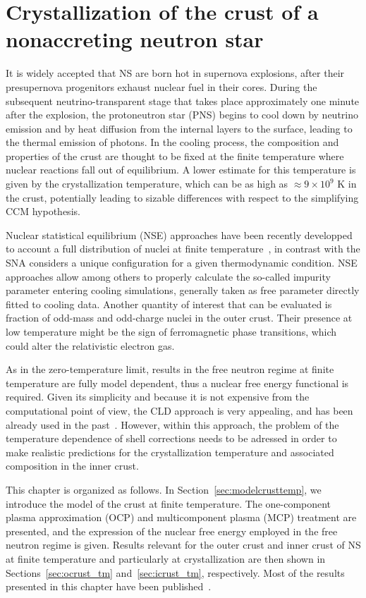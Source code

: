 \chapter{Crystallization of the crust of a nonaccreting neutron star}

It is widely accepted that NS are born hot in supernova 
explosions, after their presupernova progenitors exhaust nuclear fuel in their
cores. During the subsequent neutrino-transparent stage that takes place 
approximately one minute after the explosion, the protoneutron star (PNS) 
begins to cool down by neutrino emission and by heat diffusion from the 
internal layers to the surface, leading to the thermal emission of photons.
In the cooling process, the composition and properties of the crust are thought 
to be fixed at the finite temperature where nuclear reactions fall out of 
equilibrium. A lower estimate for this temperature is given by the 
crystallization temperature, which can be as high as $\approx 9\times 10^9$ K
in the crust, potentially leading to sizable differences with respect to
the simplifying CCM hypothesis.

Nuclear statistical equilibrium (NSE) approaches have been recently developped 
to account a full distribution of nuclei at finite 
temperature~\cite{Gulminelli2015}, in contrast with the SNA considers a unique
configuration for a given thermodynamic condition. NSE approaches allow among
others to properly calculate the so-called impurity parameter entering cooling
simulations, generally taken as free parameter directly fitted to cooling
data. Another quantity of interest that can be evaluated is fraction of 
odd-mass and odd-charge nuclei in the outer crust. Their presence at low
temperature might be the sign of ferromagnetic phase transitions, which could 
alter the relativistic electron gas.

As in the zero-temperature limit, results in the free neutron regime at
finite temperature are fully model dependent, thus a nuclear free energy
functional is required. Given its simplicity and because it is not expensive
from the computational point of view, the CLD approach is very appealing, and 
has been already used in the past~\cite{Gulminelli2015,Grams2018}. However,
within this approach, the problem of the temperature dependence of shell 
corrections needs to be adressed in order to make realistic predictions for the 
crystallization temperature and associated composition in the inner crust.

This chapter is organized as follows. In Section~\ref{sec:modelcrusttemp}, we
introduce the model of the crust at finite temperature. The one-component 
plasma approximation (OCP) and multicomponent plasma (MCP) treatment are
presented, and the expression of the nuclear free energy employed in the free
neutron regime is given. 
Results relevant for the outer crust and inner crust of NS at finite 
temperature and particularly at crystallization are then shown in 
Sections~\ref{sec:ocrust_tm} and~\ref{sec:icrust_tm}, respectively.
Most of the results presented in this chapter have been 
published~\cite{Fantina2020,Carreau2019,Carreau2020}.

